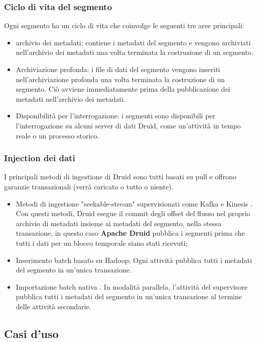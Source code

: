 \documentclass{article}
\begin{document}
\subsubsection{Ciclo di vita del segmento}
Ogni segmento ha un ciclo di vita che coinvolge le seguenti tre aree principali:
\begin{itemize}
    \item archivio dei metadati: contiene i metadati del segmento e vengono archiviati nell'archivio dei metadati una volta terminata la costruzione di un segmento.
    \item Archiviazione profonda: i file di dati del segmento vengono inseriti nell'archiviazione profonda una volta terminata la costruzione di un segmento. Ciò avviene immediatamente prima della pubblicazione dei metadati nell'archivio dei metadati.
    \item Disponibilità per l'interrogazione: i segmenti sono disponibili per l'interrogazione su alcuni server di dati Druid, come un'attività in tempo reale o un processo storico.
\end{itemize}
\pagebreak
\subsubsection{Injection dei dati}
 I principali metodi di ingestione di Druid sono tutti basati su pull e offrono garanzie transazionali (verrà caricato o tutto o niente).
 \begin{itemize}
    \item Metodi di ingestione "seekable-stream" supervisionati come Kafka e Kinesis . Con questi metodi, Druid esegue il commit degli offset del flusso nel proprio archivio di metadati insieme ai metadati del segmento, nella stessa transazione, in questo caso \textbf{Apache Druid}  pubblica i segmenti prima che tutti i dati per un blocco temporale siano stati ricevuti;
    \item Inserimento batch basato su Hadoop; Ogni attività pubblica tutti i metadati del segmento in un'unica transazione. 
    \item Importazione batch nativa . In modalità parallela, l'attività del supervisore pubblica tutti i metadati del segmento in un'unica transazione al termine delle attività secondarie.
 \end{itemize}
\subsection{Casi d'uso}
\end{document}
